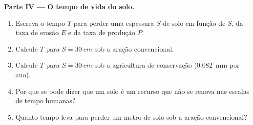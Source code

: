 \begin{problem}
\medskip
\noindent\textbf{Parte IV --- O tempo de vida do solo.}
\begin{enumerate}[resume]
  \item Escreva o tempo $T$ para perder uma espessura $S$ de solo em função
        de $S$, da taxa de erosão $E$ e da taxa de produção $P$.
  \item Calcule $T$ para $S = \qty{30}{cm}$ sob a aração convencional.
  \item Calcule $T$ para $S = \qty{30}{cm}$ sob a agricultura de conservação
        (\qty{0.082}{mm} por ano).
  \item Por que se pode dizer que um solo é um recurso que não se renova nas
        escalas de tempo humanas?
  \item Quanto tempo leva para perder um metro de solo sob a aração
        convencional?
\end{enumerate}
\end{problem}
